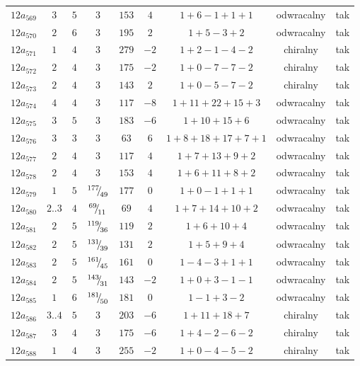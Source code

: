 \begin{longtable}{ccccccccc}
$12a_{569}$ & $3$ & $5$ & $3$ & $153$ & $4$ & $1+6-1+1+1$ & odwracalny & tak \\
$12a_{570}$ & $2$ & $6$ & $3$ & $195$ & $2$ & $1+5-3+2$ & odwracalny & tak \\
$12a_{571}$ & $1$ & $4$ & $3$ & $279$ & $-2$ & $1+2-1-4-2$ & chiralny & tak \\
$12a_{572}$ & $2$ & $4$ & $3$ & $175$ & $-2$ & $1+0-7-7-2$ & chiralny & tak \\
$12a_{573}$ & $2$ & $4$ & $3$ & $143$ & $2$ & $1+0-5-7-2$ & chiralny & tak \\
$12a_{574}$ & $4$ & $4$ & $3$ & $117$ & $-8$ & $1+11+22+15+3$ & odwracalny & tak \\
$12a_{575}$ & $3$ & $5$ & $3$ & $183$ & $-6$ & $1+10+15+6$ & odwracalny & tak \\
$12a_{576}$ & $3$ & $3$ & $3$ & $63$ & $6$ & $1+8+18+17+7+1$ & odwracalny & tak \\
$12a_{577}$ & $2$ & $4$ & $3$ & $117$ & $4$ & $1+7+13+9+2$ & odwracalny & tak \\
$12a_{578}$ & $2$ & $4$ & $3$ & $153$ & $4$ & $1+6+11+8+2$ & odwracalny & tak \\
$12a_{579}$ & $1$ & $5$ & ${}^{177}{\mskip -5mu/\mskip -3mu}_{49}$ & $177$ & $0$ & $1+0-1+1+1$ & odwracalny & tak \\
$12a_{580}$ & $2..3$ & $4$ & ${}^{69}{\mskip -5mu/\mskip -3mu}_{11}$ & $69$ & $4$ & $1+7+14+10+2$ & odwracalny & tak \\
$12a_{581}$ & $2$ & $5$ & ${}^{119}{\mskip -5mu/\mskip -3mu}_{36}$ & $119$ & $2$ & $1+6+10+4$ & odwracalny & tak \\
$12a_{582}$ & $2$ & $5$ & ${}^{131}{\mskip -5mu/\mskip -3mu}_{39}$ & $131$ & $2$ & $1+5+9+4$ & odwracalny & tak \\
$12a_{583}$ & $2$ & $5$ & ${}^{161}{\mskip -5mu/\mskip -3mu}_{45}$ & $161$ & $0$ & $1-4-3+1+1$ & odwracalny & tak \\
$12a_{584}$ & $2$ & $5$ & ${}^{143}{\mskip -5mu/\mskip -3mu}_{31}$ & $143$ & $-2$ & $1+0+3-1-1$ & odwracalny & tak \\
$12a_{585}$ & $1$ & $6$ & ${}^{181}{\mskip -5mu/\mskip -3mu}_{50}$ & $181$ & $0$ & $1-1+3-2$ & odwracalny & tak \\
$12a_{586}$ & $3..4$ & $5$ & $3$ & $203$ & $-6$ & $1+11+18+7$ & chiralny & tak \\
$12a_{587}$ & $3$ & $4$ & $3$ & $175$ & $-6$ & $1+4-2-6-2$ & chiralny & tak \\
$12a_{588}$ & $1$ & $4$ & $3$ & $255$ & $-2$ & $1+0-4-5-2$ & chiralny & tak \\

\end{longtable}
